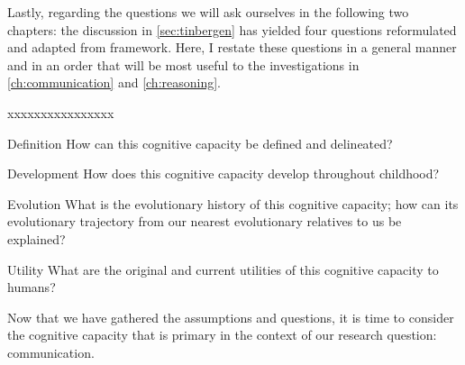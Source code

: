 Lastly, regarding the questions we will ask ourselves in the following two chapters: the discussion in \cref{sec:tinbergen} has yielded four questions reformulated and adapted from  framework. Here, I restate these questions in a general manner and in an order that will be most useful to the investigations in \cref{ch:communication} and \cref{ch:reasoning}.

\begin{labeling}{xxxxxxxxxxxxxxxx}
    \item [Definition] How can this cognitive capacity be defined and delineated?
    \item [Development] How does this cognitive capacity develop throughout childhood?
    \item [Evolution] What is the evolutionary history of this cognitive capacity; how can its evolutionary trajectory from our nearest evolutionary relatives to us be explained?
    \item [Utility] What are the original and current utilities of this cognitive capacity to humans?
\end{labeling}

Now that we have gathered the assumptions and questions, it is time to consider the cognitive capacity that is primary in the context of our research question: communication.
